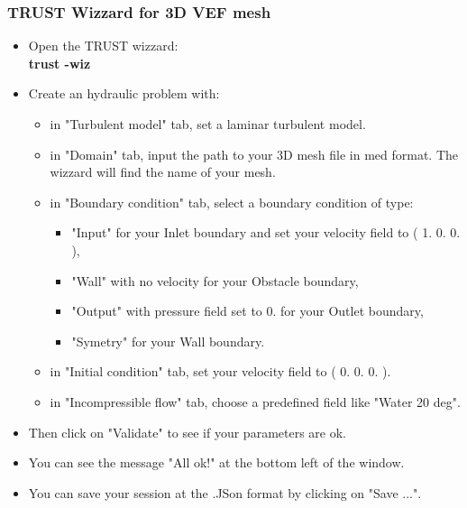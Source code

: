 \documentclass[10pt, hyperref={unicode=true,pdfusetitle, bookmarks=true,bookmarksnumbered=false,bookmarksopen=false, breaklinks=false,pdfborder={0 0 1},backref=true,colorlinks=true,linkcolor=darkblue,pageanchor}]{beamer}
\begin{document}
\begin{frame}
\frametitle{TRUST Wizzard for 3D VEF mesh}
\begin{block}{}

\begin{itemize}
\item Open the TRUST wizzard:\\
\textbf{trust -wiz}

\item Create an hydraulic problem with:
    \begin{itemize}
    \item in "Turbulent model" tab, set a laminar turbulent model.
    \item in "Domain" tab, input the path to your 3D mesh file in med format. The wizzard will find the name of your mesh.
    \item in "Boundary condition" tab, select a boundary condition of type:
        \begin{itemize}
        \item "Input" for your Inlet boundary and set your velocity field to ( 1. 0. 0. ),
        \item "Wall" with no velocity for your Obstacle boundary,
        \item "Output" with pressure field set to 0. for your Outlet boundary,
        \item "Symetry" for your Wall boundary.
        \end{itemize}
    \item in "Initial condition" tab, set your velocity field to ( 0. 0. 0. ).
    \item in "Incompressible flow" tab, choose a predefined field like "Water 20 deg".
    \end{itemize}
\item Then click on "Validate" to see if your parameters are ok.
\item You can see the message "All ok!" at the bottom left of the window.
\item You can save your session at the .JSon format by clicking on "Save ...".
\end{itemize}
\end{block}
\end{frame}
\end{document}
